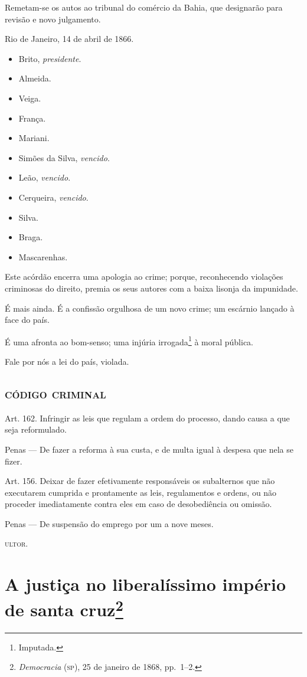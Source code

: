 Remetam-se os autos ao tribunal do comércio da Bahia, que designarão
para revisão e novo julgamento.

Rio de Janeiro, 14 de abril de 1866.

\begin{itemize}
\tightlist
\item
  Brito, \emph{presidente}.
\item
  Almeida.
\item
  Veiga.
\item
  França.
\item
  Mariani.
\item
  Simões da Silva, \emph{vencido}.
\item
  Leão, \emph{vencido}.
\item
  Cerqueira, \emph{vencido}.
\item
  Silva.
\item
  Braga.
\item
  Mascarenhas.
\end{itemize}

Este acórdão encerra uma apologia ao crime; porque, reconhecendo
violações criminosas do direito, premia os seus autores com a baixa
lisonja da impunidade.

É mais ainda. É a confissão orgulhosa de um novo crime; um escárnio
lançado à face do país.

É uma afronta ao bom-senso; uma injúria irrogada\footnote{Imputada.} à
moral pública.

Fale por nós a lei do país, violada.

\section{\textsc{código criminal}}

Art. 162. Infringir as leis que regulam a ordem do processo, dando causa
a que seja reformulado.

Penas --- De fazer a reforma à sua custa, e de multa igual à despesa que
nela se fizer.

Art. 156. Deixar de fazer efetivamente responsáveis os subalternos que
não executarem cumprida e prontamente as leis, regulamentos e ordens, ou
não proceder imediatamente contra eles em caso de desobediência ou
omissão.

Penas --- De suspensão do emprego por um a nove meses.

\textsc{ultor}.

\chapter{A justiça no liberalíssimo império de santa cruz\footnote{\emph{Democracia} (\textsc{sp}), 25 de janeiro de 1868, pp.~1--2.}}

